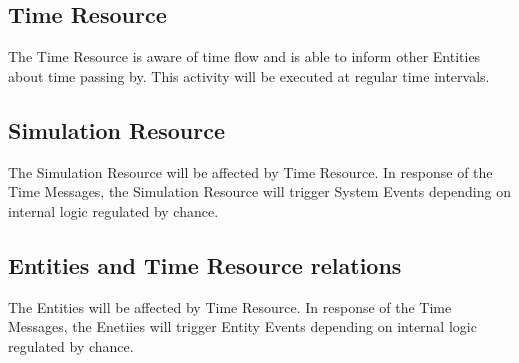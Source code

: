\subsection{Time Resource} 
The Time Resource is aware of time flow and is able to inform other Entities about time passing by. This activity will be executed at regular time intervals.

\subsection{Simulation Resource} 
The Simulation Resource will be affected by Time Resource. In response of the Time Messages, the Simulation Resource will trigger System Events depending on internal logic regulated by chance.

\subsection{Entities and Time Resource relations} 
The Entities will be affected by Time Resource. In response of the Time Messages, the Enetiies will trigger Entity Events depending on internal logic regulated by chance.